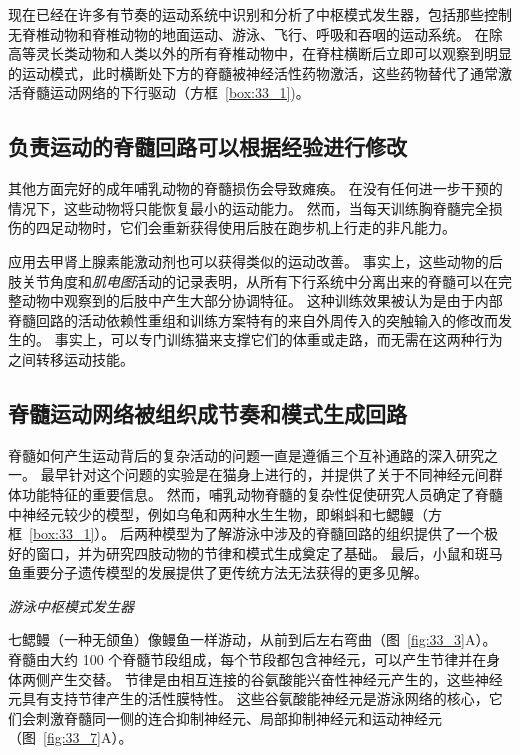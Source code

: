 现在已经在许多有节奏的运动系统中识别和分析了中枢模式发生器，包括那些控制无脊椎动物和脊椎动物的地面运动、游泳、飞行、呼吸和吞咽的运动系统。
在除高等灵长类动物和人类以外的所有脊椎动物中，在脊柱横断后立即可以观察到明显的运动模式，此时横断处下方的脊髓被神经活性药物激活，这些药物替代了通常激活脊髓运动网络的下行驱动（方框~\ref{box:33_1})。



\subsection{负责运动的脊髓回路可以根据经验进行修改}

其他方面完好的成年哺乳动物的脊髓损伤会导致瘫痪。
在没有任何进一步干预的情况下，这些动物将只能恢复最小的运动能力。
然而，当每天训练胸脊髓完全损伤的四足动物时，它们会重新获得使用后肢在跑步机上行走的非凡能力。


应用去甲肾上腺素能激动剂也可以获得类似的运动改善。
事实上，这些动物的后肢关节角度和\textit{肌电图}活动的记录表明，从所有下行系统中分离出来的脊髓可以在完整动物中观察到的后肢中产生大部分协调特征。
这种训练效果被认为是由于内部脊髓回路的活动依赖性重组和训练方案特有的来自外周传入的突触输入的修改而发生的。
事实上，可以专门训练猫来支撑它们的体重或走路，而无需在这两种行为之间转移运动技能。



\subsection{脊髓运动网络被组织成节奏和模式生成回路}

脊髓如何产生运动背后的复杂活动的问题一直是遵循三个互补通路的深入研究之一。
最早针对这个问题的实验是在猫身上进行的，并提供了关于不同神经元间群体功能特征的重要信息。
然而，哺乳动物脊髓的复杂性促使研究人员确定了脊髓中神经元较少的模型，例如乌龟和两种水生生物，即蝌蚪和七鳃鳗（方框~\ref{box:33_1}）。
后两种模型为了解游泳中涉及的脊髓回路的组织提供了一个极好的窗口，并为研究四肢动物的节律和模式生成奠定了基础。
最后，小鼠和斑马鱼重要分子遗传模型的发展提供了更传统方法无法获得的更多见解。


\textit{游泳中枢模式发生器}

七鳃鳗（一种无颌鱼）像鳗鱼一样游动，从前到后左右弯曲（图~\ref{fig:33_3}A）。
脊髓由大约 100 个脊髓节段组成，每个节段都包含神经元，可以产生节律并在身体两侧产生交替。
节律是由相互连接的谷氨酸能兴奋性神经元产生的，这些神经元具有支持节律产生的活性膜特性。
这些谷氨酸能神经元是游泳网络的核心，它们会刺激脊髓同一侧的连合抑制神经元、局部抑制神经元和运动神经元（图~\ref{fig:33_7}A）。


